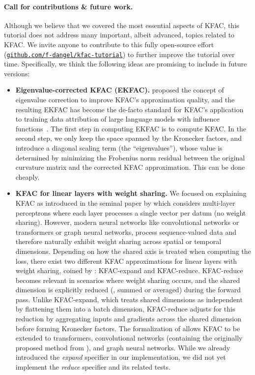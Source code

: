 \paragraph{Call for contributions \& future work.} Although we believe that we covered the most essential aspects of KFAC, this tutorial does not address many important, albeit advanced, topics related to KFAC.
We invite anyone to contribute to this fully open-source effort (\href{\repourl}{\texttt{github.com/f-dangel/kfac-tutorial}}) to further improve the tutorial over time.
Specifically, we think the following ideas are promising to include in future versions:
\begin{itemize}
\item \textbf{Eigenvalue-corrected KFAC (EKFAC).}
  \citet{george2018fast} proposed the concept of eigenvalue correction to improve KFAC's approximation quality, and the resulting EKFAC has become the de-facto standard for KFAC's application to training data attribution of large language models with influence functions~\cite{grosse2023studying}.
  The first step in computing EKFAC is to compute KFAC.
  In the second step, we only keep the space spanned by the Kronecker factors, and introduce a diagonal scaling term (the ``eigenvalues''), whose value is determined by minimizing the Frobenius norm residual between the original curvature matrix and the corrected KFAC approximation.
  This can be done cheaply.

\item \textbf{KFAC for linear layers with weight sharing.}
  We focused on explaining KFAC as introduced in the seminal paper by \citet{martens2015optimizing} which considers multi-layer perceptrons where each layer processes a single vector per datum (\ie no weight sharing).
  However, modern neural networks like convolutional networks or transformers or graph neural networks, process sequence-valued data and therefore naturally exhibit weight sharing across spatial or temporal dimensions.
  Depending on how the shared axis is treated when computing the loss, there exist two different KFAC approximations for linear layers with weight sharing, coined by \citet{eschenhagen2023kroneckerfactored}: KFAC-expand and KFAC-reduce.
  KFAC-reduce becomes relevant in scenarios where weight sharing occurs, and the shared dimension is explicitly reduced (\eg, summed or averaged) during the forward pass.
  Unlike KFAC-expand, which treats shared dimensions as independent by flattening them into a batch dimension, KFAC-reduce adjusts for this reduction by aggregating inputs and gradients across the shared dimension before forming Kronecker factors.
  The formalization of \citet{eschenhagen2023kroneckerfactored} allows KFAC to be extended to transformers, convolutional networks (containing the originally proposed method from \citet{grosse2016kroneckerfactored}), and graph neural networks.
  While we already introduced the \emph{expand} specifier in our implementation, we did not yet implement the \emph{reduce} specifier and its related tests.


\end{itemize}
